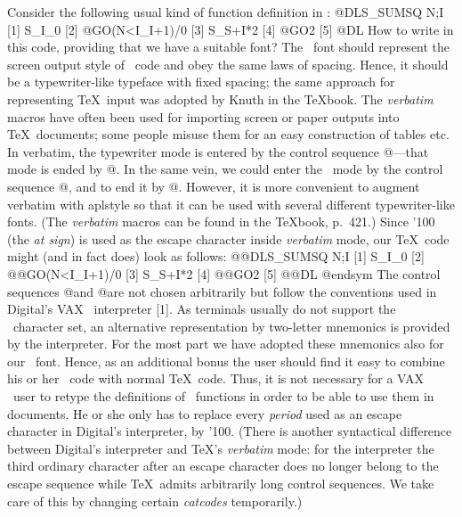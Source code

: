 Consider the following usual kind of function definition in \APL:
\begintt
        @DLS_SUMSQ N;I
  [1]   S_I_0
  [2]   @GO(N<I_I+1)/0
  [3]   S_S+I*2
  [4]   @GO2
  [5]   @DL
\endtt
{}%
How to write in this code, providing that we have a suitable
font? The \APL\ font should represent the screen
output style of \APL\ code and obey the same laws of spacing.
Hence, it should be a typewriter-like typeface with fixed
spacing; the same approach for representing \TeX\ input was
adopted by Knuth in the {\TeX}book.
The {\it verbatim\/} macros have often been used for importing
screen or paper outputs into \TeX\ documents; some people
misuse them for an easy construction of tables etc. In
{\sltt verbatim}, the typewriter mode is entered by the control
sequence @\begintt@---that mode is ended by
@\endtt@. In the same vein, we could enter
the \APL\ mode by the control sequence @\beginapl@,
and to end it by @\endapl@. However, it is more convenient to
augment {\sltt verbatim\/} with {\sltt aplstyle\/} so that
it can be used with several different typewriter-like fonts.
(The {\it verbatim\/} macros can be found in the {\TeX}book,
p.\ 421.)  Since {\sltt\char'100\/}
(the {\it at sign}) is used as the escape character inside {\it verbatim\/}
mode, our \TeX\ code might (and in fact does) look as follows:
\def\endsym{\char'134{endtt}}   %
\begintt
           \begintt
                  @@DLS_SUMSQ N;I
            [1]   S_I_0
            [2]   @@GO(N<I_I+1)/0
            [3]   S_S+I*2
            [4]   @@GO2
            [5]   @@DL
           @endsym
\endtt
{}%
The control sequences @\DL@ and @\GO@ are not chosen arbitrarily
but follow the conventions used in Digital's VAX \APL\ interpreter [1].
As terminals usually do not support the \APL\ character set, an
alternative representation by two-letter mnemonics is provided by the
interpreter. For the most part we have adopted these mnemonics also for our
\APL\ font. Hence, as an additional bonus the user should find it
easy to combine his or her \APL\ code with normal \TeX\ code. Thus,
it is not necessary for a VAX \APL\ user to retype the definitions
of \APL\ functions in order to be able to use them in documents.
He or she only has to replace every {\it period\/} used as an
escape character in Digital's interpreter, by {\sltt\char'100}.
(There is another syntactical difference between Digital's interpreter
and \TeX's {\it verbatim\/} mode: for the interpreter
the third ordinary character after an escape character
does no longer belong to the escape sequence while \TeX\ admits
arbitrarily long control sequences.  We take care of this
by changing certain {\it catcodes\/} temporarily.)
%
%
%
%
